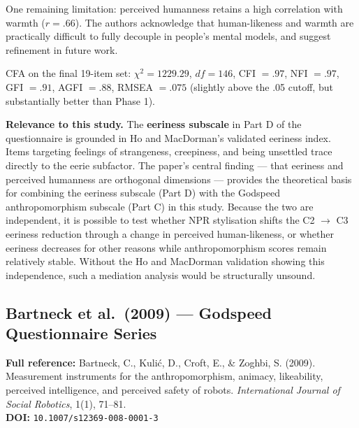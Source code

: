 \documentclass[11pt, a4paper]{article}
\begin{document}
One remaining limitation: perceived humanness retains a high correlation with warmth ($r = .66$). The authors acknowledge that human-likeness and warmth are practically difficult to fully decouple in people's mental models, and suggest refinement in future work.

CFA on the final 19-item set: $\chi^{2} = 1229.29$, $df = 146$, CFI $= .97$, NFI $= .97$, GFI $= .91$, AGFI $= .88$, RMSEA $= .075$ (slightly above the .05 cutoff, but substantially better than Phase 1).

\medskip
\noindent\textbf{Relevance to this study.} The \textbf{eeriness subscale} in Part D of the questionnaire is grounded in Ho and MacDorman's validated eeriness index. Items targeting feelings of strangeness, creepiness, and being unsettled trace directly to the eerie subfactor. The paper's central finding --- that eeriness and perceived humanness are orthogonal dimensions --- provides the theoretical basis for combining the eeriness subscale (Part D) with the Godspeed anthropomorphism subscale (Part C) in this study. Because the two are independent, it is possible to test whether NPR stylisation shifts the C2 $\to$ C3 eeriness reduction through a change in perceived human-likeness, or whether eeriness decreases for other reasons while anthropomorphism scores remain relatively stable. Without the Ho and MacDorman validation showing this independence, such a mediation analysis would be structurally unsound.

\subsection{Bartneck et al.\ (2009) --- Godspeed Questionnaire Series}

\begin{infobox}
\small
\textbf{Full reference:} Bartneck, C., Kuli\'{c}, D., Croft, E., \& Zoghbi, S. (2009). Measurement instruments for the anthropomorphism, animacy, likeability, perceived intelligence, and perceived safety of robots. \textit{International Journal of Social Robotics}, 1(1), 71--81.\\[4pt]
\textbf{DOI:} \texttt{10.1007/s12369-008-0001-3}
\end{infobox}
\end{document}
